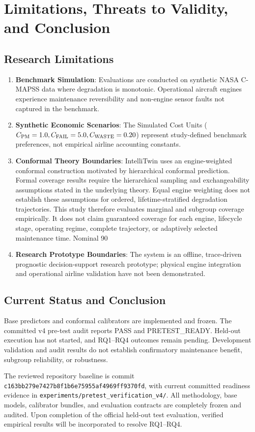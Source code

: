 \section{Limitations, Threats to Validity, and Conclusion}

\subsection{Research Limitations}
\begin{enumerate}
  \item \textbf{Benchmark Simulation}: Evaluations are conducted on synthetic NASA C-MAPSS data where degradation is monotonic. Operational aircraft engines experience maintenance reversibility and non-engine sensor faults not captured in the benchmark.
  \item \textbf{Synthetic Economic Scenarios}: The Simulated Cost Units ($C_{\text{PM}}=1.0, C_{\text{FAIL}}=5.0, C_{\text{WASTE}}=0.20$) represent study-defined benchmark preferences, not empirical airline accounting constants.
  \item \textbf{Conformal Theory Boundaries}: IntelliTwin uses an engine-weighted conformal construction motivated by hierarchical conformal prediction. Formal coverage results require the hierarchical sampling and exchangeability assumptions stated in the underlying theory. Equal engine weighting does not establish these assumptions for ordered, lifetime-stratified degradation trajectories. This study therefore evaluates marginal and subgroup coverage empirically. It does not claim guaranteed coverage for each engine, lifecycle stage, operating regime, complete trajectory, or adaptively selected maintenance time. Nominal 90%
  \item \textbf{Research Prototype Boundaries}: The system is an offline, trace-driven prognostic decision-support research prototype; physical engine integration and operational airline validation have not been demonstrated.
\end{enumerate}

\subsection{Current Status and Conclusion}
Base predictors and conformal calibrators are implemented and frozen. The committed v4 pre-test audit reports PASS and PRETEST\_READY. Held-out execution has not started, and RQ1–RQ4 outcomes remain pending. Development validation and audit results do not establish confirmatory maintenance benefit, subgroup reliability, or robustness.

The reviewed repository baseline is commit \texttt{c163bb279e7427b8f1b6e75955af4969ff9370fd}, with current committed readiness evidence in \texttt{experiments/pretest\_verification\_v4/}. All methodology, base models, calibrator bundles, and evaluation contracts are completely frozen and audited. Upon completion of the official held-out test evaluation, verified empirical results will be incorporated to resolve RQ1--RQ4.
